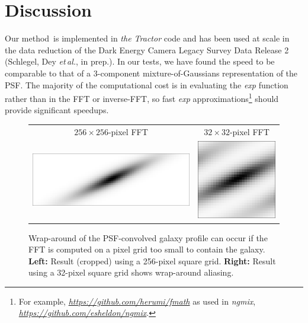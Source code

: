 \documentclass[11pt,preprint]{aastex}
\newcommand{\foreign}[1]{\emph{#1}}
\newcommand{\etal}{\foreign{et\,al.}}
\newcommand{\niceurl}[1]{\href{#1}{\textsl{#1}}}
\newcommand{\project}[1]{\textsl{#1}}
\newcommand{\trick}{method}
\begin{document}
\begin{figure}
  \begin{center}
  \end{center}
  \caption{\label{fig:psfmog}
  }
\end{figure}

\section{Discussion}

Our \trick\ is implemented in \project{the Tractor} code and has been
used at scale in the data reduction of the Dark Energy Camera Legacy
Survey Data Release 2 (Schlegel, Dey \etal, in prep.).  In our tests, we
have found the speed to be comparable to that of a 3-component
mixture-of-Gaussians representation of the PSF.  The majority of the
computational cost is in evaluating the \emph{exp} function rather
than in the FFT or inverse-FFT, so fast \emph{exp} approximations\footnote{%
For example, \niceurl{https://github.com/herumi/fmath} as used in
\project{ngmix}, \niceurl{https://github.com/esheldon/ngmix}.}
should provide significant speedups.



\begin{figure}
\begin{center}
\begin{tabular}{@{}cc@{}}
  $256 \times 256$-pixel FFT &
  $32 \times 32$-pixel FFT \\
  \includegraphics[height=0.22\textwidth]{gal-00} &
  \includegraphics[height=0.22\textwidth]{gal-01} \\
\end{tabular}
\end{center}
\caption{\label{fig:wrap}%
  Wrap-around of the PSF-convolved galaxy profile can occur if the FFT is
  computed on a pixel grid too small to contain the galaxy.
  \textbf{Left:} Result (cropped) using a 256-pixel square grid.
  \textbf{Right:} Result using a 32-pixel square grid shows wrap-around
  aliasing.
}
\end{figure}
\end{document}
